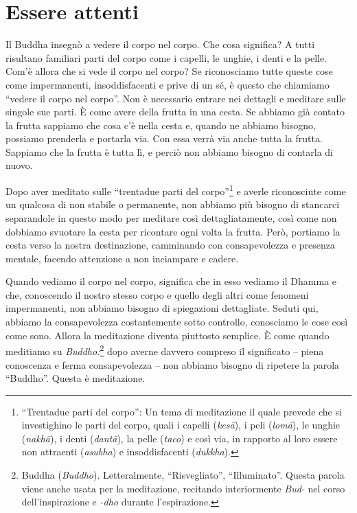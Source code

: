 \chapter{Essere attenti}

Il Buddha insegnò a vedere il corpo nel corpo. Che cosa significa? A
tutti risultano familiari parti del corpo come i capelli, le unghie, i
denti e la pelle. Com'è allora che si vede il corpo nel corpo? Se
riconosciamo tutte queste cose come impermanenti, insoddisfacenti e
prive di un sé, è questo che chiamiamo ``vedere il corpo nel corpo''.
Non è necessario entrare nei dettagli e meditare sulle singole sue
parti. È come avere della frutta in una cesta. Se abbiamo già contato la
frutta sappiamo che cosa c'è nella cesta e, quando ne abbiamo bisogno,
possiamo prenderla e portarla via. Con essa verrà via anche tutta la
frutta. Sappiamo che la frutta è tutta lì, e perciò non abbiamo bisogno
di contarla di nuovo.

Dopo aver meditato sulle ``trentadue parti del corpo''\footnote{%
  ``Trentadue parti del corpo'': Un tema di meditazione il quale prevede che si
  investighino le parti del corpo, quali i capelli (\emph{kesā}), i peli
  (\emph{lomā}), le unghie (\emph{nakhā}), i denti (\emph{dantā}), la
  pelle (\emph{taco}) e così via, in rapporto al loro essere non
  attraenti (\emph{asubha}) e insoddisfacenti (\emph{dukkha}).}
e averle riconosciute come un qualcosa di non stabile o permanente, non abbiamo
più bisogno di stancarci separandole in questo modo per meditare così
dettagliatamente, così come non dobbiamo svuotare la cesta per ricontare
ogni volta la frutta. Però, portiamo la cesta verso la nostra
destinazione, camminando con consapevolezza e presenza mentale, facendo
attenzione a non inciampare e cadere.

Quando vediamo il corpo nel corpo, significa che in esso vediamo il
Dhamma e che, conoscendo il nostro stesso corpo e quello degli altri
come fenomeni impermanenti, non abbiamo bisogno di spiegazioni
dettagliate. Seduti qui, abbiamo la consapevolezza costantemente sotto
controllo, conosciamo le cose così come sono. Allora la meditazione
diventa piuttosto semplice. È come quando meditiamo su
\emph{Buddho:}\footnote{Buddha (\emph{Buddho}). Letteralmente,
  ``Risvegliato'', ``Illuminato''. Questa parola viene anche usata per
  la meditazione, recitando interiormente \emph{Bud-} nel corso
  dell'inspirazione e \emph{-dho} durante l'espirazione.} dopo averne
davvero compreso il significato -- piena conoscenza e ferma
consapevolezza -- non abbiamo bisogno di ripetere la parola ``Buddho''.
Questa è meditazione.

